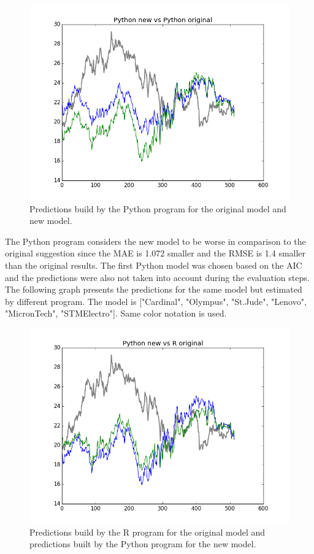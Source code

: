 \documentclass[
  twoside,
  11pt, a4paper,
  footinclude=true,
  headinclude=true,
  cleardoublepage=empty
]{scrreprt}
\begin{document}
    \begin{figure}[h]
        \includegraphics[scale=0.5]{img_examples/PythonOriginalVsPythonNew.png}
        \centering
        \caption{Predictions build by the Python program for the original model and new model.}
        \label{fig:PythonOriginalVsPythonNew}
    \end{figure}
    
    The Python program considers the new model to be worse in comparison to the original suggestion since the MAE is 1.072 smaller and the RMSE is 1.4 smaller than the original results. The first Python model was chosen based on the AIC and the predictions were also not taken into account during the evaluation steps.\\
    The following graph presents the predictions for the same model but estimated by different program. The model is ["Cardinal", "Olympus", "St.Jude", "Lenovo", "MicronTech", "STMElectro"]. Same color notation is used.
    
    \begin{figure}[h]
        \includegraphics[scale=0.5]{img_examples/ROriginalVsPythonNew.png}
        \centering
        \caption{Predictions build by the R program for the original model and predictions built by the Python program for the new model.}
        \label{fig:ROriginalVsPythonNew}
    \end{figure}
    
\end{document}
